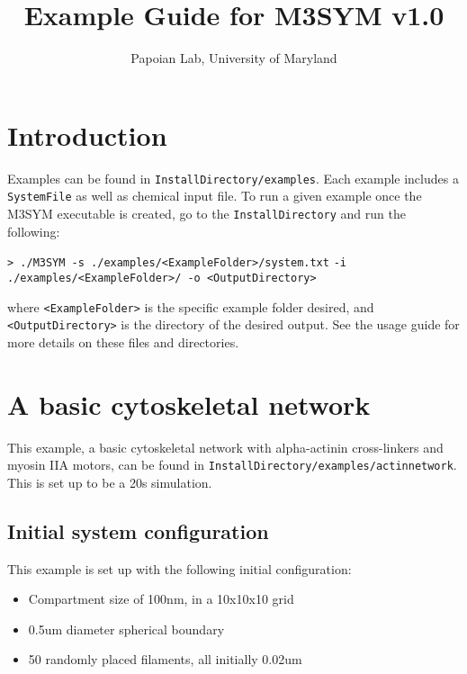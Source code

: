\documentclass[11pt, oneside]{article}   	%
\title{Example Guide for M3SYM v1.0}
\author{Papoian Lab, University of Maryland}
\date{}							%
\begin{document}
\maketitle

\tableofcontents
\newpage

\section{Introduction}

Examples can be found in \texttt{InstallDirectory/examples}. Each example includes a \texttt{SystemFile} as well as chemical input file. To run a given example once the M3SYM executable is created, go to the \texttt{InstallDirectory} and run the following:\newline

\indent \texttt{> ./M3SYM -s ./examples/<ExampleFolder>/system.txt}\newline
\indent\indent \texttt{-i ./examples/<ExampleFolder>/  -o <OutputDirectory>}\newline

\noindent where \texttt{<ExampleFolder>} is the specific example folder desired, and \texttt{<OutputDirectory>} is the directory of the desired output. See the usage guide for more details on these files and directories.


\section{A basic cytoskeletal network}

This example, a basic cytoskeletal network with alpha-actinin cross-linkers and myosin IIA motors, can be found in
\texttt{InstallDirectory/examples/actinnetwork}. This is set up to be a 20s simulation.

\subsection{Initial system configuration}
 
 This example is set up with the following initial configuration:
 
 \begin{itemize}
 \item Compartment size of 100nm, in a 10x10x10 grid 
 \item 0.5um diameter spherical boundary
 \item 50 randomly placed filaments, all initially 0.02um
 \end{itemize}
\end{document}
